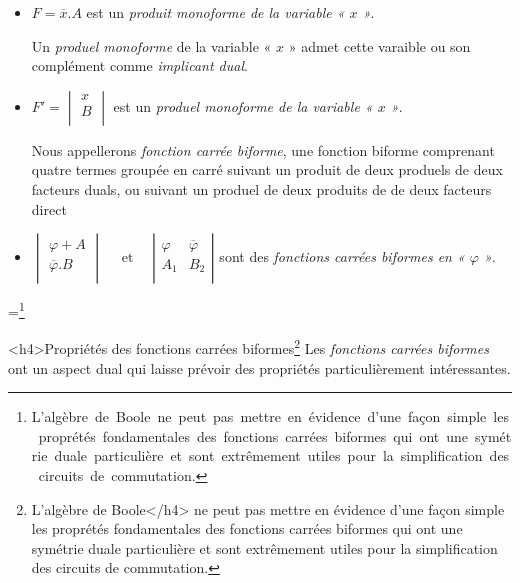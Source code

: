 \begin{itemize}
\item $ F = \overline{x} . A $ est un \emph{produit monoforme de la variable « $x$ »}. 

Un \emph{produel monoforme} de la variable « $x$ » admet cette varaible ou son complément comme \emph{implicant dual}.

\item $F' = \begin{vmatrix}
x \\ B \\
\end{vmatrix}$  est un \emph{produel monoforme de la variable « $x$ »}. 

Nous appellerons \emph{fonction carrée biforme}, une fonction biforme comprenant quatre termes groupée en carré suivant un produit de deux produels de deux facteurs duals, ou suivant un produel de deux produits de de deux facteurs direct 



\item   $  \begin{vmatrix}  {\varphi} + A  \\
                                 \overline{ \varphi} . B  \\
                               \end{vmatrix}
                                \quad \text{ et } \quad  
                                \left| \begin{array}{c|c} \varphi  & \overline{\varphi}\\ A_1 & B_2 \\
\end{array} \right| $ sont des \emph{fonctions carrées biformes en « $\varphi$ »}.
 
\end{itemize} 

=\hbox{\footnote{L'algèbre de {\sc Boole} ne peut pas mettre en évidence d'une façon simple les proprétés fondamentales des fonctions carrées biformes qui ont une symétrie duale particulière et sont extrêmement utiles pour la simplification des circuits de commutation.}}


<h4>Propriétés des fonctions carrées biformes\protect\footnote{L'algèbre de {\sc Boole</h4> ne peut pas mettre en évidence d'une façon simple les proprétés fondamentales des fonctions carrées biformes qui ont une symétrie duale particulière et sont extrêmement utiles pour la simplification des circuits de commutation.} } Les \emph{fonctions  carrées biformes} ont un aspect dual qui laisse prévoir des propriétés particulièrement intéressantes.



